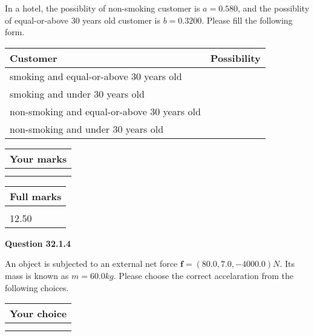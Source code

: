\documentclass[12pt]{article}
\begin{document}
  
In a hotel, the possiblity of  %
non-smoking customer is
$a =  %
0.580$, and the possiblity of  %
equal-or-above 30 years old customer is $ b =  %
0.3200$.
Please fill the following form.
 
\noindent
\begin{tabular}{|l|l|}
\hline
Customer & Possibility \\
\hline
smoking  and   %
equal-or-above 30 years old  & \\
\hline
smoking  and   %
under 30 years old & \\
\hline
 non-smoking and   %
equal-or-above 30 years old  & \\
\hline
 non-smoking and  %
under 30 years old & \\
\hline
\end{tabular}
 
 
 

 

 
\vspace{0.3in}
  
\vspace{0.2in}
  
         \begin{tabular}{|l|}
\hline
 Your marks  \\
\hline
 \\ 
 \\ 
\hline
\end{tabular}
\hspace{0.05in} \begin{tabular}{|l|}
\hline
 Full marks  \\
\hline
 \\ 
12.50 \\
\hline
\end{tabular}
{\textbf{\Large{Question
32.1.4 
}}}
  
  
 
An object is subjected to an external net force $\mathbf{f}=(
80.0 ,
7.0,
-4000.0  )N$. Its mass is known as
$m= %
60.0  kg$. Please choose the correct accelaration
from the following choices.
 
  
  
\noindent\hspace{3.0in} \begin{tabular}{|l|}
\hline
Your choice \\
\hline
 \\ 
 \\ 
\hline
\end{tabular}
  
\end{document}
